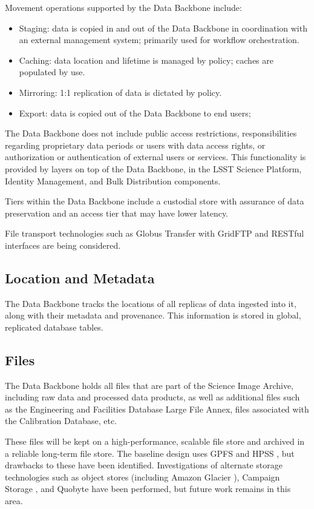 \documentclass[DM,lsstdraft,toc]{lsstdoc}
\begin{document}
Movement operations supported by the Data Backbone include:
\begin{itemize}
	\item Staging: data is copied in and out of the Data Backbone in coordination with an external management system; primarily used for workflow orchestration.
	\item Caching: data location and lifetime is managed by policy; caches are populated by use.
	\item Mirroring: 1:1 replication of data is dictated by policy.
	\item Export: data is copied out of the Data Backbone to end users; 
\end{itemize}

The Data Backbone does not include public access restrictions, responsibilities
regarding proprietary data periods or users with data access rights, or
authorization or authentication of external users or services. This
functionality is provided by layers on top of the Data Backbone, in the
LSST Science Platform, Identity Management, and Bulk Distribution components.

Tiers within the Data Backbone include a custodial store with assurance of
data preservation and an access tier that may have lower latency.

File transport technologies such as Globus Transfer \citep{GlobusTransfer} with
GridFTP and RESTful interfaces are being considered.

\subsection{Location and Metadata}\label{dbb-location-and-metadata}

The Data Backbone tracks the locations of all replicas of data ingested into
it, along with their metadata and provenance.  This information is stored in
global, replicated database tables.

\subsection{Files}\label{dbb-files}

The Data Backbone holds all files that are part of the Science Image Archive,
including raw data and processed data products, as well as additional files
such as the Engineering and Facilities Database Large File Annex, files
associated with the Calibration Database, etc.

These files will be kept on a high-performance, scalable file store and
archived in a reliable long-term file store.  The baseline design uses GPFS
\citep{GPFS} and HPSS \citep{HPSS}, but drawbacks to these have been
identified.  Investigations of alternate storage technologies such as object
stores (including Amazon Glacier \citep{AmazonGlacier}), Campaign Storage
\citep{CampaignStorage}, and Quobyte \citep{Quobyte} have been performed, but
future work remains in this area.
\end{document}
